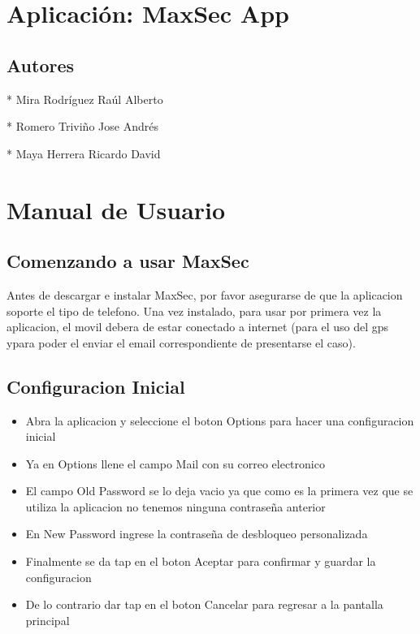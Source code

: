 \documentclass[12pt,letterpaper]{article}
\begin{document}
\section{Aplicación: MaxSec App}
\subsection{Autores}

* Mira Rodríguez Raúl Alberto

* Romero Triviño Jose Andrés

* Maya Herrera Ricardo David


\section{Manual de Usuario}
\subsection{Comenzando a usar MaxSec}

Antes de descargar e instalar MaxSec, por favor asegurarse de que la aplicacion soporte el tipo de telefono.
Una vez instalado, para usar por primera vez la aplicacion, el movil debera de estar conectado a internet (para el uso del gps ypara poder el enviar el email correspondiente de presentarse el caso).

\subsection{Configuracion Inicial}

 \begin{itemize}

\item{Abra la aplicacion y seleccione el boton Options para hacer una configuracion inicial}

\item{Ya en Options llene el campo Mail con su correo electronico}

\item{El campo Old Password se lo deja vacio ya que como es la primera vez que se utiliza la aplicacion no tenemos ninguna contraseña anterior}

\item{En New Password ingrese la contraseña de desbloqueo personalizada}

\item{Finalmente se da tap en el boton Aceptar para confirmar y guardar la configuracion}

\item{De lo contrario dar tap en el boton Cancelar para regresar a la pantalla principal}

\end{itemize}
\end{document}
